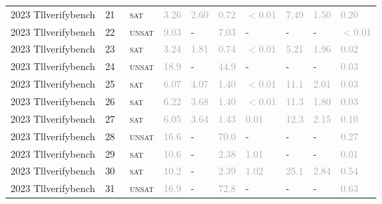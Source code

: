 \begin{center}
{\begin{longtable}{@{}llllllllll@{}}
2023 Tllverifybench & 21 & ~\textsc{sat} & \textcolor{darkgray}{3.26} & \textcolor{darkgray}{2.60} & \textcolor{darkgray}{0.72} & \textcolor{darkgray}{$<$0.01} & \textcolor{darkgray}{7.49} & \textcolor{darkgray}{1.50} & \textcolor{darkgray}{0.20} \\
2023 Tllverifybench & 22 & ~\textsc{unsat} & \textcolor{darkgray}{9.03} & - & \textcolor{darkgray}{7.03} & - & - & - & \textcolor{darkgray}{$<$0.01} \\
2023 Tllverifybench & 23 & ~\textsc{sat} & \textcolor{darkgray}{3.24} & \textcolor{darkgray}{1.81} & \textcolor{darkgray}{0.74} & \textcolor{darkgray}{$<$0.01} & \textcolor{darkgray}{5.21} & \textcolor{darkgray}{1.96} & \textcolor{darkgray}{0.02} \\
2023 Tllverifybench & 24 & ~\textsc{unsat} & \textcolor{darkgray}{18.9} & - & \textcolor{darkgray}{44.9} & - & - & - & \textcolor{darkgray}{0.03} \\
2023 Tllverifybench & 25 & ~\textsc{sat} & \textcolor{darkgray}{6.07} & \textcolor{darkgray}{4.07} & \textcolor{darkgray}{1.40} & \textcolor{darkgray}{$<$0.01} & \textcolor{darkgray}{11.1} & \textcolor{darkgray}{2.01} & \textcolor{darkgray}{0.03} \\
2023 Tllverifybench & 26 & ~\textsc{sat} & \textcolor{darkgray}{6.22} & \textcolor{darkgray}{3.68} & \textcolor{darkgray}{1.40} & \textcolor{darkgray}{$<$0.01} & \textcolor{darkgray}{11.3} & \textcolor{darkgray}{1.80} & \textcolor{darkgray}{0.03} \\
2023 Tllverifybench & 27 & ~\textsc{sat} & \textcolor{darkgray}{6.05} & \textcolor{darkgray}{3.64} & \textcolor{darkgray}{1.43} & \textcolor{darkgray}{0.01} & \textcolor{darkgray}{12.3} & \textcolor{darkgray}{2.15} & \textcolor{darkgray}{0.10} \\
2023 Tllverifybench & 28 & ~\textsc{unsat} & \textcolor{darkgray}{16.6} & - & \textcolor{darkgray}{70.0} & - & - & - & \textcolor{darkgray}{0.27} \\
2023 Tllverifybench & 29 & ~\textsc{sat} & \textcolor{darkgray}{10.6} & - & \textcolor{darkgray}{2.38} & \textcolor{darkgray}{1.01} & - & - & \textcolor{darkgray}{0.01} \\
2023 Tllverifybench & 30 & ~\textsc{sat} & \textcolor{darkgray}{10.2} & - & \textcolor{darkgray}{2.39} & \textcolor{darkgray}{1.02} & \textcolor{darkgray}{25.1} & \textcolor{darkgray}{2.84} & \textcolor{darkgray}{0.54} \\
2023 Tllverifybench & 31 & ~\textsc{unsat} & \textcolor{darkgray}{16.9} & - & \textcolor{darkgray}{72.8} & - & - & - & \textcolor{darkgray}{0.63} \\

\end{longtable}}
\end{center}
